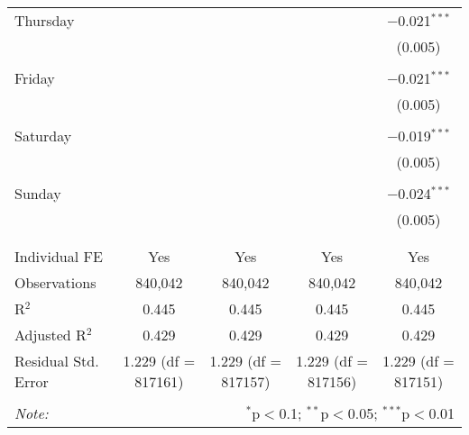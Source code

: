 \documentclass[
]{article}
\begin{document}
\begin{table}[!htbp]
{\begin{tabular}{@{\extracolsep{5pt}}lcccc}
 Thursday &  &  &  & $-$0.021$^{***}$ \\ 
  &  &  &  & (0.005) \\ 
  & & & & \\ 
 Friday &  &  &  & $-$0.021$^{***}$ \\ 
  &  &  &  & (0.005) \\ 
  & & & & \\ 
 Saturday &  &  &  & $-$0.019$^{***}$ \\ 
  &  &  &  & (0.005) \\ 
  & & & & \\ 
 Sunday &  &  &  & $-$0.024$^{***}$ \\ 
  &  &  &  & (0.005) \\ 
  & & & & \\ 
\hline \\[-1.8ex] 
Individual FE & Yes & Yes & Yes & Yes \\ 
Observations & 840,042 & 840,042 & 840,042 & 840,042 \\ 
R$^{2}$ & 0.445 & 0.445 & 0.445 & 0.445 \\ 
Adjusted R$^{2}$ & 0.429 & 0.429 & 0.429 & 0.429 \\ 
Residual Std. Error & 1.229 (df = 817161) & 1.229 (df = 817157) & 1.229 (df = 817156) & 1.229 (df = 817151) \\ 
\hline 
\hline \\[-1.8ex] 
\textit{Note:}  & \multicolumn{4}{r}{$^{*}$p$<$0.1; $^{**}$p$<$0.05; $^{***}$p$<$0.01} \\ 
\end{tabular}
} 
\end{table} 
\newpage
\end{document}
